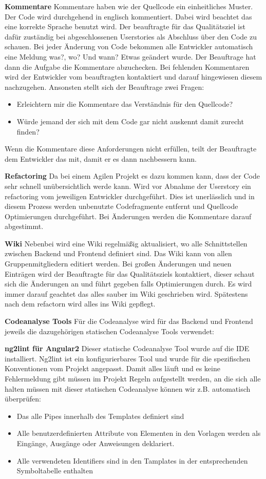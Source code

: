 \documentclass[accentcolor=tud0b,12pt,paper=a4]{tudreport}
\begin{document}
\textbf{Kommentare}
Kommentare haben wie der Quellcode ein einheitliches Muster. Der Code wird durchgehend in englisch kommentiert. Dabei wird beachtet das eine korrekte Sprache benutzt wird. Der beauftragte für das Qualitätsziel ist dafür zuständig bei abgeschlossenen Userstories als Abschluss über den Code zu schauen. Bei jeder Änderung von Code bekommen alle Entwickler automatisch eine Meldung was?, wo? Und wann? Etwas geändert wurde. Der Beauftrage hat dann die Aufgabe die Kommentare abzuchecken. Bei fehlenden Kommentaren wird der Entwickler vom beauftragten kontaktiert und darauf hingewiesen diesem nachzugehen. Ansonsten stellt sich der Beauftrage zwei Fragen:
\begin{itemize}
\item Erleichtern mir die Kommentare das Verständnis für den Quellcode?
\item Würde jemand der sich mit dem Code gar nicht auskennt damit zurecht finden?
\end{itemize}
Wenn die Kommentare diese Anforderungen nicht erfüllen, teilt der Beauftragte dem Entwickler das mit, damit er es dann nachbessern kann.




\textbf{Refactoring}
Da bei einem Agilen Projekt es dazu kommen kann, dass der Code sehr schnell unübersichtlich werde kann. Wird vor Abnahme der Userstory ein refactoring vom jeweiligen Entwickler durchgeführt. Dies ist unerlässlich und in diesem Prozess werden unbenutzte Codefragmente entfernt und Quellcode Optimierungen durchgeführt. Bei Änderungen werden die Kommentare darauf abgestimmt.


\textbf{Wiki}
Nebenbei wird eine Wiki regelmäßig aktualisiert, wo alle Schnittstellen zwischen Backend und Frontend definiert sind. Das Wiki kann von allen Gruppenmitgliedern editiert werden. Bei großen Änderungen und neuen Einträgen wird der Beauftragte für das Qualitätsziels kontaktiert, dieser schaut sich die Änderungen an und führt gegeben falls Optimierungen durch. Es wird immer darauf geachtet das alles sauber im Wiki geschrieben wird. Spätestens nach dem refactorn wird alles ins Wiki gepflegt.

\textbf{Codeanalyse Tools}
Für die Codeanalyse wird für das Backend und Frontend jeweils die dazugehörigen statischen Codeanalyse Tools verwendet:

\textbf{ng2lint für Angular2}
Dieser statische Codeanalyse Tool wurde auf die IDE installiert. Ng2lint ist ein konfigurierbares Tool und wurde für die spezifischen Konventionen vom Projekt angepasst. Damit alles läuft und es keine Fehlermeldung gibt müssen im Projekt Regeln aufgestellt werden, an die sich alle halten müssen mit dieser statischen Codeanalyse können wir z.B. automatisch überprüfen:
\begin{itemize}
\item Das alle Pipes innerhalb des Templates definiert sind
\item Alle benutzerdefinierten Attribute von Elementen in den Vorlagen werden als Eingänge, Ausgänge oder Anweisungen deklariert.
\item Alle verwendeten Identifiers sind in den Tamplates in der entsprechenden Symboltabelle enthalten
\end{itemize}
\end{document}
